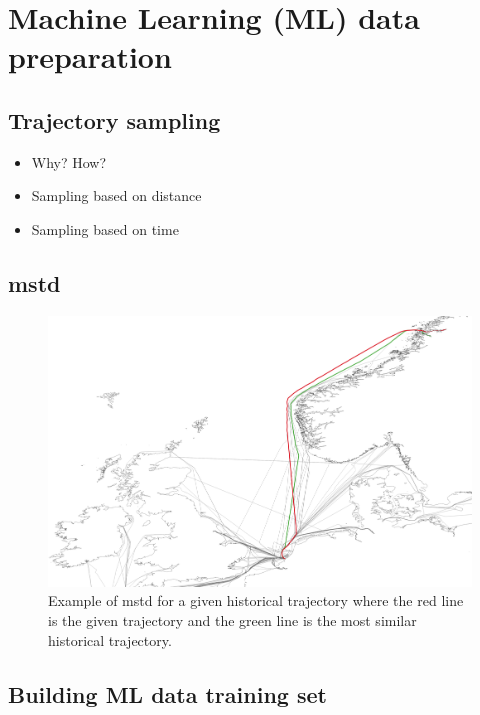 \section{Machine Learning (ML) data preparation}

\subsection{Trajectory sampling}

\begin{itemize}
    \item Why? How?
    \item Sampling based on distance
    \item Sampling based on time
\end{itemize}

\subsection{\acrfull{mstd}}

\begin{figure}[htbp]  %
    \centering
    \includegraphics[width=1.0\textwidth]{figures/mstd}
    \caption{Example of \acrshort{mstd} for a given historical trajectory where the red line is the given trajectory and the green line is the most similar historical trajectory.}
    \label{fig:mstd}
\end{figure}


\subsection{Building ML data training set}

